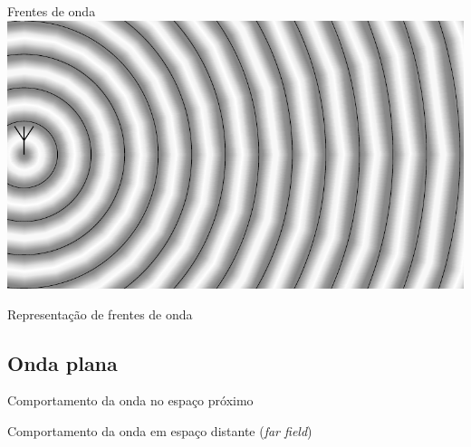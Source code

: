     \begin{frame}{Frentes de onda}
        \includegraphics{../pictures/signal+lines.pdf}
    \end{frame}

    \begin{frame}{Representação de frentes de onda}
        
    \end{frame}

\subsection{Onda plana}

    \begin{frame}{Comportamento da onda no espaço próximo}
        
    \end{frame}

    \begin{frame}{Comportamento da onda em espaço distante (\textit{far field})}
        
    \end{frame}
